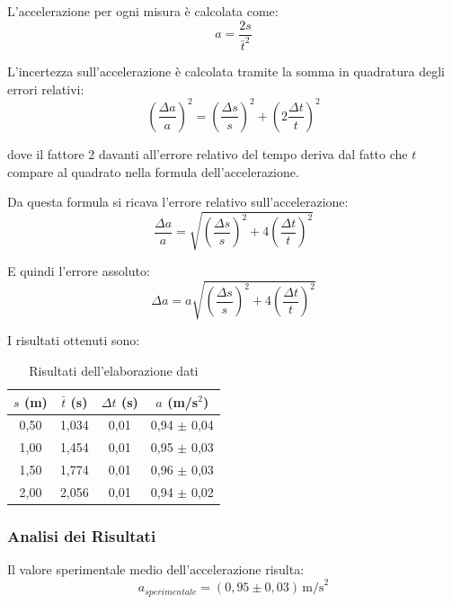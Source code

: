 L'accelerazione per ogni misura è calcolata come:
\begin{equation}
    a = \frac{2s}{\bar{t}^2}
\end{equation}

L'incertezza sull'accelerazione è calcolata tramite la somma in quadratura degli errori relativi:
\begin{equation}
    \left(\frac{\Delta a}{a}\right)^2 = \left(\frac{\Delta s}{s}\right)^2 + \left(2\frac{\Delta t}{t}\right)^2
\end{equation}

dove il fattore 2 davanti all'errore relativo del tempo deriva dal fatto che $t$ compare al quadrato nella formula dell'accelerazione.

Da questa formula si ricava l'errore relativo sull'accelerazione:
\begin{equation}
    \frac{\Delta a}{a} = \sqrt{\left(\frac{\Delta s}{s}\right)^2 + 4\left(\frac{\Delta t}{t}\right)^2}
\end{equation}

E quindi l'errore assoluto:
\begin{equation}
    \Delta a = a\sqrt{\left(\frac{\Delta s}{s}\right)^2 + 4\left(\frac{\Delta t}{t}\right)^2}
\end{equation}

I risultati ottenuti sono:

\begin{table}[H]
\centering
\caption{Risultati dell'elaborazione dati}
\label{tab:risultati}
\begin{tabular}{cccc}
\toprule
$s$ (m) & $\bar{t}$ (s) & $\Delta t$ (s) & $a$ (m/s$^2$) \\
\midrule
0,50 & 1,034 & 0,01 & 0,94 $\pm$ 0,04 \\
1,00 & 1,454 & 0,01 & 0,95 $\pm$ 0,03 \\
1,50 & 1,774 & 0,01 & 0,96 $\pm$ 0,03 \\
2,00 & 2,056 & 0,01 & 0,94 $\pm$ 0,02 \\
\bottomrule
\end{tabular}
\end{table}

\subsubsection{Analisi dei Risultati}
Il valore sperimentale medio dell'accelerazione risulta:
\begin{equation}
    a_{sperimentale} = (0,95 \pm 0,03)\,\text{m/s}^2
\end{equation}

